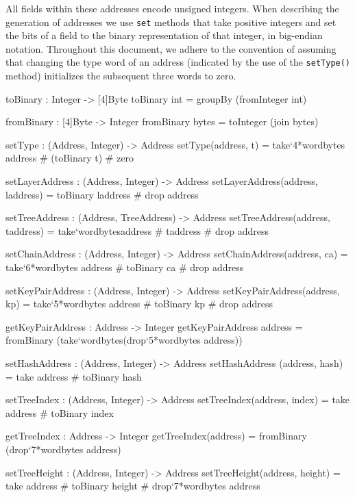 
   All fields within these addresses encode unsigned integers.  When
   describing the generation of addresses we use \texttt{set} methods that
   take positive integers and set the bits of a field to the binary
   representation of that integer, in big-endian
   notation. Throughout this document, we adhere to the convention
   of assuming that changing the type word of an address
   (indicated by the use of the \texttt{setType()} method)
   initializes the subsequent three words to zero.

\begin{code}
  toBinary : Integer -> [4]Byte
  toBinary int = groupBy (fromInteger int)

  fromBinary : [4]Byte -> Integer
  fromBinary bytes = toInteger (join bytes)
\end{code}

\begin{code}
  setType : (Address, Integer) -> Address
  setType(address, t) = take`{4*wordbytes} address # (toBinary t) # zero

  setLayerAddress : (Address, Integer) -> Address
  setLayerAddress(address, laddress) = toBinary laddress # drop address

  setTreeAddress : (Address, TreeAddress) -> Address
  setTreeAddress(address, taddress) =
      take`{wordbytes}address # taddress # drop address

  setChainAddress : (Address, Integer) -> Address
  setChainAddress(address, ca) =
      take`{6*wordbytes} address # toBinary ca # drop address

  setKeyPairAddress : (Address, Integer) -> Address
  setKeyPairAddress(address, kp) =
      take`{5*wordbytes} address # toBinary kp # drop address

  getKeyPairAddress : Address -> Integer
  getKeyPairAddress address =
    fromBinary (take`{wordbytes}(drop`{5*wordbytes} address))

  setHashAddress : (Address, Integer) -> Address
  setHashAddress (address, hash) = take address # toBinary hash 
   
  setTreeIndex : (Address, Integer) -> Address
  setTreeIndex(address, index) = take address # toBinary index

  getTreeIndex : Address -> Integer
  getTreeIndex(address) = fromBinary (drop`{7*wordbytes} address)

  setTreeHeight : (Address, Integer) -> Address
  setTreeHeight(address, height) =
      take address # toBinary height # drop`{7*wordbytes} address
\end{code}

